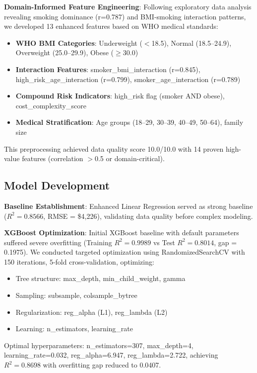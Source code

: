 \documentclass[conference]{IEEEtran}
\begin{document}
\textbf{Domain-Informed Feature Engineering}: Following exploratory data analysis revealing smoking dominance (r=0.787) and BMI-smoking interaction patterns, we developed 13 enhanced features based on WHO medical standards:

\begin{itemize}
\item \textbf{WHO BMI Categories}: Underweight ($<$18.5), Normal (18.5--24.9), Overweight (25.0--29.9), Obese ($\geq$30.0)
\item \textbf{Interaction Features}: smoker\_bmi\_interaction (r=0.845), high\_risk\_age\_interaction (r=0.799), smoker\_age\_interaction (r=0.789)
\item \textbf{Compound Risk Indicators}: high\_risk flag (smoker AND obese), cost\_complexity\_score
\item \textbf{Medical Stratification}: Age groups (18--29, 30--39, 40--49, 50--64), family size
\end{itemize}

This preprocessing achieved data quality score 10.0/10.0 with 14 proven high-value features (correlation $>$0.5 or domain-critical).

\subsection{Model Development}

\textbf{Baseline Establishment}: Enhanced Linear Regression served as strong baseline ($R^2 = 0.8566$, RMSE = \$4,226), validating data quality before complex modeling.

\textbf{XGBoost Optimization}: Initial XGBoost baseline with default parameters suffered severe overfitting (Training $R^2 = 0.9989$ vs Test $R^2 = 0.8014$, gap = 0.1975). We conducted targeted optimization using RandomizedSearchCV with 150 iterations, 5-fold cross-validation, optimizing:
\begin{itemize}
\item Tree structure: max\_depth, min\_child\_weight, gamma
\item Sampling: subsample, colsample\_bytree
\item Regularization: reg\_alpha (L1), reg\_lambda (L2)
\item Learning: n\_estimators, learning\_rate
\end{itemize}

Optimal hyperparameters: n\_estimators=307, max\_depth=4, learning\_rate=0.032, reg\_alpha=6.947, reg\_lambda=2.722, achieving $R^2 = 0.8698$ with overfitting gap reduced to 0.0407.
\end{document}

